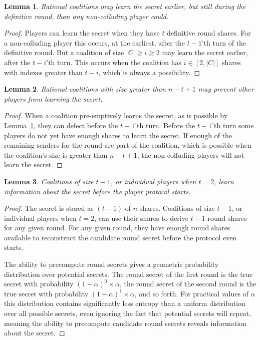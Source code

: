 \documentclass{dalcsthesis}
\newtheorem{lemma}{Lemma}
\begin{document}
\begin{lemma}\label{Lem:ABIP:Preempt}Rational coalitions may learn the secret earlier, but still during the definitive round, than any non-colluding player could.\end{lemma}
\begin{proof}
Players can learn the secret when they have $t$ definitive round shares. For a non-colluding player this occurs, at the earliest, after the $t-1$'th turn of the definitive round. But a coalition of size $|C| \geq i \geq 2$ may learn the secret earlier, after the $t-i$'th turn. This occurs when the coalition has $i \in [2, |C|]$ shares with indexes greater than $t-i$, which is always a possibility.
\end{proof}

\begin{lemma}\label{Lem:ABIP:RatColsCanPrevents}Rational coalitions with size greater than $n-t+1$ may prevent other players from learning the secret.\end{lemma}
\begin{proof}
When a coalition pre-emptively learns the secret, as is possible by Lemma~\ref{Lem:ABIP:Preempt}, they can defect before the $t-1$'th turn. Before the $t-1$'th turn some players do not yet have enough shares to learn the secret. If enough of the remaining senders for the round are part of the coalition, which is possible when the coalition's size is greater than $n-t+1$, the non-colluding players will not learn the secret.
\end{proof}

\begin{lemma}Coalitions of size $t-1$, or individual players when $t=2$, learn information about the secret before the player protocol starts.\end{lemma}
\begin{proof}
The secret is stored as $(t-1)$-of-$n$ shares. Coalitions of size $t-1$, or individual players when $t=2$, can use their shares to derive $t-1$ round shares for any given round. For any given round, they have enough round shares available to reconstruct the candidate round secret before the protocol even starts.

The ability to precompute round secrets gives a geometric probability distribution over potential secrets. The round secret of the first round is the true secret with probability $(1-\alpha)^0 \times \alpha$, the round secret of the second round is the true secret with probability $(1-\alpha)^1 \times \alpha$, and so forth. For practical values of $\alpha$ this distribution contains significantly less entropy than a uniform distribution over all possible secrets, even ignoring the fact that potential secrets will repeat, meaning the ability to precompute candidate round secrets reveals information about the secret.
\end{proof}
\end{document}

